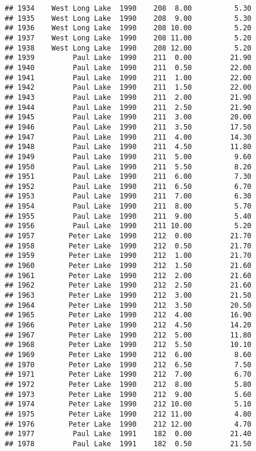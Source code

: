 \documentclass[
]{article}
\begin{document}
\begin{verbatim}
## 1934    West Long Lake  1990    208  8.00          5.30
## 1935    West Long Lake  1990    208  9.00          5.30
## 1936    West Long Lake  1990    208 10.00          5.20
## 1937    West Long Lake  1990    208 11.00          5.20
## 1938    West Long Lake  1990    208 12.00          5.20
## 1939         Paul Lake  1990    211  0.00         21.90
## 1940         Paul Lake  1990    211  0.50         22.00
## 1941         Paul Lake  1990    211  1.00         22.00
## 1942         Paul Lake  1990    211  1.50         22.00
## 1943         Paul Lake  1990    211  2.00         21.90
## 1944         Paul Lake  1990    211  2.50         21.90
## 1945         Paul Lake  1990    211  3.00         20.00
## 1946         Paul Lake  1990    211  3.50         17.50
## 1947         Paul Lake  1990    211  4.00         14.30
## 1948         Paul Lake  1990    211  4.50         11.80
## 1949         Paul Lake  1990    211  5.00          9.60
## 1950         Paul Lake  1990    211  5.50          8.20
## 1951         Paul Lake  1990    211  6.00          7.30
## 1952         Paul Lake  1990    211  6.50          6.70
## 1953         Paul Lake  1990    211  7.00          6.30
## 1954         Paul Lake  1990    211  8.00          5.70
## 1955         Paul Lake  1990    211  9.00          5.40
## 1956         Paul Lake  1990    211 10.00          5.20
## 1957        Peter Lake  1990    212  0.00         21.70
## 1958        Peter Lake  1990    212  0.50         21.70
## 1959        Peter Lake  1990    212  1.00         21.70
## 1960        Peter Lake  1990    212  1.50         21.60
## 1961        Peter Lake  1990    212  2.00         21.60
## 1962        Peter Lake  1990    212  2.50         21.60
## 1963        Peter Lake  1990    212  3.00         21.50
## 1964        Peter Lake  1990    212  3.50         20.50
## 1965        Peter Lake  1990    212  4.00         16.90
## 1966        Peter Lake  1990    212  4.50         14.20
## 1967        Peter Lake  1990    212  5.00         11.80
## 1968        Peter Lake  1990    212  5.50         10.10
## 1969        Peter Lake  1990    212  6.00          8.60
## 1970        Peter Lake  1990    212  6.50          7.50
## 1971        Peter Lake  1990    212  7.00          6.70
## 1972        Peter Lake  1990    212  8.00          5.80
## 1973        Peter Lake  1990    212  9.00          5.60
## 1974        Peter Lake  1990    212 10.00          5.10
## 1975        Peter Lake  1990    212 11.00          4.80
## 1976        Peter Lake  1990    212 12.00          4.70
## 1977         Paul Lake  1991    182  0.00         21.40
## 1978         Paul Lake  1991    182  0.50         21.50

\end{verbatim}
\end{document}
